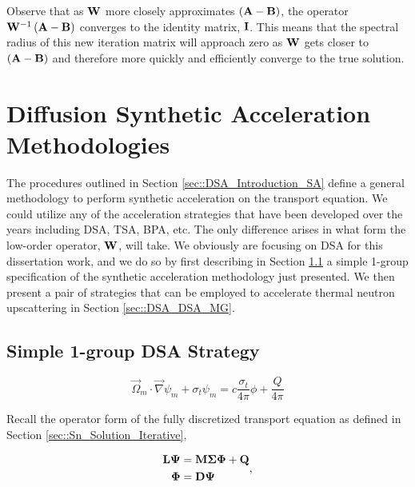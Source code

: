 \noindent Observe that as ${\bf W}$ more closely approximates $\left(  {\bf A} - {\bf B}  \right)$, the operator ${\bf W}^{-1} \left(  {\bf A} - {\bf B}  \right)$ converges to the identity matrix, ${\bf I}$. This means that the spectral radius of this new iteration matrix will approach zero as ${\bf W}$ gets closer to $\left(  {\bf A} - {\bf B}  \right)$ and therefore more quickly and efficiently converge to the true solution.

\section{Diffusion Synthetic Acceleration Methodologies}
\label{sec::DSA_DSA}

The procedures outlined in Section \ref{sec::DSA_Introduction_SA} define a general methodology to perform synthetic acceleration on the transport equation. We could utilize any of the acceleration strategies that have been developed over the years including DSA, TSA, BPA, etc. The only difference arises in what form the low-order operator, ${\bf W}$, will take. We obviously are focusing on DSA for this dissertation work, and we do so by first describing in Section \ref{sec::DSA_DSA_1G} a simple 1-group specification of the synthetic acceleration methodology just presented. We then present a pair of strategies that can be employed to accelerate thermal neutron upscattering in Section \ref{sec::DSA_DSA_MG}.

\subsection{Simple 1-group DSA Strategy}
\label{sec::DSA_DSA_1G}

\begin{equation}
\label{eq::DSA_1G_simple_trans}
\vec{\Omega}_m \cdot \vec{\nabla} \psi_m + \sigma_t \psi_m =  c \frac{ \sigma_t}{4 \pi} \phi + \frac{Q}{4 \pi}
\end{equation}

Recall the operator form of the fully discretized transport equation as defined in Section \ref{sec::Sn_Solution_Iterative},

\begin{equation}
\label{eq::DSA_1G_trans_eq_ops}
\begin{aligned}
{\bf L} {\bf \Psi} &= {\bf M} {\bf \Sigma} {\bf \Phi}  +    {\bf Q} \\
{\bf \Phi} &=  {\bf D} {\bf \Psi}
\end{aligned},
\end{equation}

